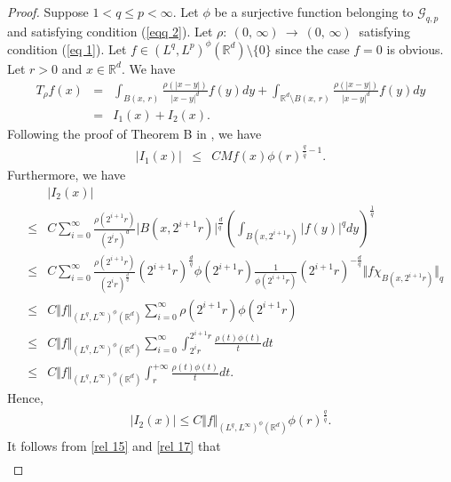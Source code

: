 \documentclass[a4paper,12pt,intlimits,oneside]{amsart}
\numberwithin{equation}{section}
\numberwithin{equation}{section}
\theoremstyle{definition}
\begin{document}
\begin{proof}
Suppose $1 < q\leq p < \infty$. Let $\phi$ be a surjective function belonging to $ \mathcal{G}_{q,p}$ and satisfying condition (\ref{eqq 2}). Let $\rho : \: (0,\, \infty) \:  \to \: (0,\, \infty) \:$ satisfying condition (\ref{eq 1}).  Let $f \in (L^{q},L^{p})^{\phi}(\mathbb{R}^{d})\setminus \{ 0 \}$ since the case $f=0$ is obvious. Let $r>0$ and $x \in \mathbb{R}^{d}$. We have
\begin{eqnarray*}
 T_{\rho} f(x)&=&\displaystyle\int_{B(x,\, r)}\frac{\rho(\left|x-y\right|)}{\left|x-y\right|^{d}}f(y)dy+\displaystyle\int_{\mathbb{R}^{d}\setminus B(x,\, r)}\frac{\rho(\left|x-y\right|)}{\left|x-y\right|^{d}}f(y)dy\\ &=& I_{1}(x) + I_{2}(x) . 
\end{eqnarray*}
Following the proof of Theorem B in \cite{GE0}, we have
\begin{eqnarray}  \label{rel 15}
 \vert I_{1}(x) \vert & \leq &  C M f(x) \phi(r)^{\frac{q}{\bar{q}}-1}.
\end{eqnarray}
Furthermore, we have
\begin{eqnarray*}
& &\vert I_{2}(x) \vert  \\
& \leq & C\sum\limits^{\infty}_{i=0}\frac{\rho(2^{i+1}r)}{(2^{i}r)^{d}} \vert B(x,2^{i+1}r) \vert^{\frac{d}{q^{'}}} \left( \displaystyle\int_{B(x,2^{i+1}r)} \vert f(y)\vert^{q} dy\right)^{\frac{1}{q}}\\
 &\leq & C \sum\limits^{\infty}_{i=0}\frac{\rho(2^{i+1}r)}{(2^{i}r)^{\frac{d}{q}}} (2^{i+1}r)^{\frac{d}{q}} \phi(2^{i+1}r)\frac{1}{\phi(2^{i+1}r)}(2^{i+1}r)^{-\frac{d}{q}} \Vert f \chi_{B(x,2^{i+1}r)}   \Vert_{q} \\
 &\leq & C \Vert f \Vert_{(L^{q},L^{\infty})^{\phi}(\mathbb{R}^{d})}\sum\limits^{\infty}_{i=0} \rho(2^{i+1}r) \phi(2^{i+1}r)\\&\leq & C \Vert f \Vert_{(L^{q},L^{\infty})^{\phi}(\mathbb{R}^{d})}\sum\limits^{\infty}_{i=0} \displaystyle\int_{2^{i}r}^{2^{i+1}r} \frac{\rho(t)\phi(t)}{t} dt \\&\leq & C \Vert f \Vert_{(L^{q},L^{\infty})^{\phi}(\mathbb{R}^{d})}\displaystyle\int_{r}^{+\infty} \frac{\rho(t)\phi(t)}{t} dt.
\end{eqnarray*}
Hence,
\begin{eqnarray}\label{rel 17}
\vert I_{2}(x) \vert \leq C \Vert f \Vert_{(L^{q},L^{\infty})^{\phi}(\mathbb{R}^{d})}\phi(r)^{\frac{q}{\bar{q}}}.
\end{eqnarray}
It follows from \eqref{rel 15} and \eqref{rel 17} that
\begin{eqnarray*}

\end{eqnarray*}
\end{proof}
\end{document}
